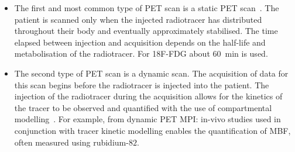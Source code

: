                 \begin{itemize}
                    \item The first and most common type of \gls{PET} scan is a static \gls{PET} scan~. The patient is scanned only when the injected radiotracer has distributed throughout their body and eventually approximately stabilised. %
                    The time elapsed between injection and acquisition depends on the half-life and metabolisation of the radiotracer. For \gls{18F-FDG} about \SI{60}{\minute} is used.
                    
                    \item The second type of \gls{PET} scan is a dynamic scan. The acquisition of data for this scan begins before the radiotracer is injected into the patient. The injection of the radiotracer during the acquisition allows for the kinetics of the tracer to be observed and quantified with the use of compartmental modelling~. For example, from dynamic \gls{PET} \gls{MPI}: %
                    in-vivo studies used in conjunction with tracer kinetic modelling enables the quantification of \gls{MBF}, often measured using rubidium-$82$. %
                \end{itemize}
            
